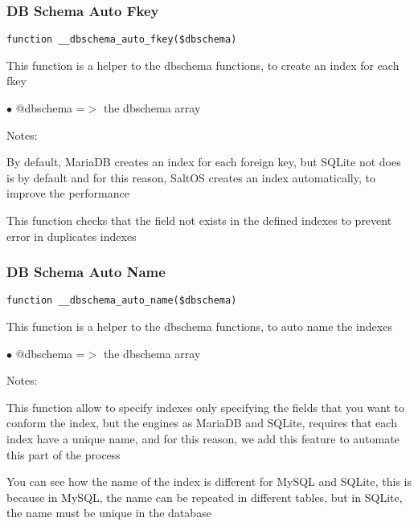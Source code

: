 \documentclass[a4paper]{article}
\begin{document}
\hypertarget{toc422}{}
\subsubsection{DB Schema Auto Fkey}

\begin{lstlisting}
function __dbschema_auto_fkey($dbschema)
\end{lstlisting}

This function is a helper to the dbschema functions, to create an index for each fkey

\begin{compactitem}
\item[\color{myblue}$\bullet$] @dbschema =$>$ the dbschema array
\end{compactitem}

Notes:

By default, MariaDB creates an index for each foreign key, but SQLite not does is by default
and for this reason, SaltOS creates an index automatically, to improve the performance

This function checks that the field not exists in the defined indexes to prevent error in duplicates
indexes

\hypertarget{toc423}{}
\subsubsection{DB Schema Auto Name}

\begin{lstlisting}
function __dbschema_auto_name($dbschema)
\end{lstlisting}

This function is a helper to the dbschema functions, to auto name the indexes

\begin{compactitem}
\item[\color{myblue}$\bullet$] @dbschema =$>$ the dbschema array
\end{compactitem}

Notes:

This function allow to specify indexes only specifying the fields that you want
to conform the index, but the engines as MariaDB and SQLite, requires that each
index have a unique name, and for this reason, we add this feature to automate
this part of the process

You can see how the name of the index is different for MySQL and SQLite, this is
because in MySQL, the name can be repeated in different tables, but in SQLite,
the name must be unique in the database
\end{document}
